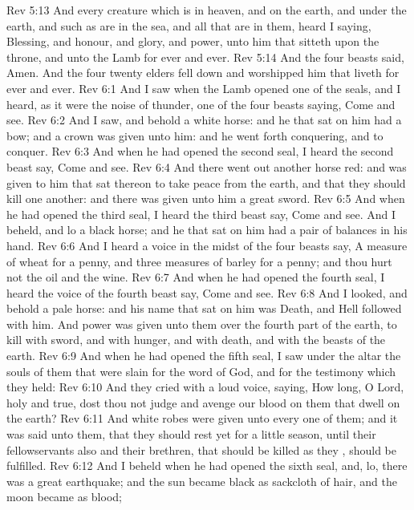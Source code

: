 \vs Rev 5:13 And every creature which is in heaven, and on the earth, and under the earth, and such as are in the sea, and all that are in them, heard I saying, Blessing, and honour, and glory, and power,  unto him that sitteth upon the throne, and unto the Lamb for ever and ever.
\vs Rev 5:14 And the four beasts said, Amen. And the four  twenty elders fell down and worshipped him that liveth for ever and ever.
\vs Rev 6:1 And I saw when the Lamb opened one of the seals, and I heard, as it were the noise of thunder, one of the four beasts saying, Come and see.
\vs Rev 6:2 And I saw, and behold a white horse: and he that sat on him had a bow; and a crown was given unto him: and he went forth conquering, and to conquer.
\vs Rev 6:3 And when he had opened the second seal, I heard the second beast say, Come and see.
\vs Rev 6:4 And there went out another horse  red: and  was given to him that sat thereon to take peace from the earth, and that they should kill one another: and there was given unto him a great sword.
\vs Rev 6:5 And when he had opened the third seal, I heard the third beast say, Come and see. And I beheld, and lo a black horse; and he that sat on him had a pair of balances in his hand.
\vs Rev 6:6 And I heard a voice in the midst of the four beasts say, A measure of wheat for a penny, and three measures of barley for a penny; and  thou hurt not the oil and the wine.
\vs Rev 6:7 And when he had opened the fourth seal, I heard the voice of the fourth beast say, Come and see.
\vs Rev 6:8 And I looked, and behold a pale horse: and his name that sat on him was Death, and Hell followed with him. And power was given unto them over the fourth part of the earth, to kill with sword, and with hunger, and with death, and with the beasts of the earth.
\vs Rev 6:9 And when he had opened the fifth seal, I saw under the altar the souls of them that were slain for the word of God, and for the testimony which they held:
\vs Rev 6:10 And they cried with a loud voice, saying, How long, O Lord, holy and true, dost thou not judge and avenge our blood on them that dwell on the earth?
\vs Rev 6:11 And white robes were given unto every one of them; and it was said unto them, that they should rest yet for a little season, until their fellowservants also and their brethren, that should be killed as they , should be fulfilled.
\vs Rev 6:12 And I beheld when he had opened the sixth seal, and, lo, there was a great earthquake; and the sun became black as sackcloth of hair, and the moon became as blood;
